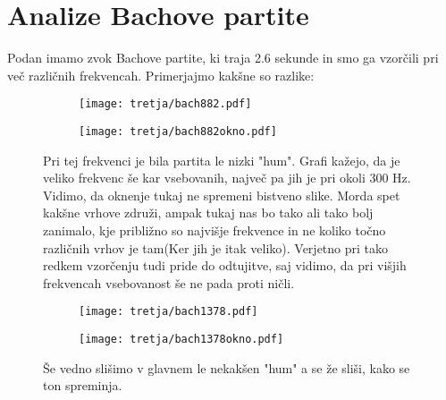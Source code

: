 \documentclass{article}
\begin{document}
\section{Analize Bachove partite}

Podan imamo zvok Bachove partite, ki traja 2.6 sekunde in smo ga vzorčili pri več različnih frekvencah. Primerjajmo kakšne so razlike:

\begin{figure}[H]
\begin{subfigure}{.5\textwidth}
\texttt{[image: tretja/bach882.pdf]}

\end{subfigure}
\begin{subfigure}{.5\textwidth}
\texttt{[image: tretja/bach882okno.pdf]}
\end{subfigure}
\caption*{Pri tej frekvenci je bila partita le nizki "hum". Grafi kažejo, da je veliko frekvenc še kar vsebovanih, največ pa jih je pri okoli 300 Hz. Vidimo, da oknenje tukaj ne spremeni bistveno slike.
Morda spet kakšne vrhove združi, ampak tukaj nas bo tako ali tako bolj zanimalo, kje približno so najvišje frekvence in ne koliko točno različnih vrhov je tam(Ker jih je itak veliko). Verjetno pri tako redkem vzorčenju tudi pride do odtujitve, saj vidimo, da pri višjih frekvencah vsebovanost še ne pada proti ničli.}
\end{figure}

\begin{figure}[H]
\begin{subfigure}{.5\textwidth}
\texttt{[image: tretja/bach1378.pdf]}

\end{subfigure}
\begin{subfigure}{.5\textwidth}
\texttt{[image: tretja/bach1378okno.pdf]}
\end{subfigure}
\caption*{Še vedno slišimo v glavnem le nekakšen "hum" a se že sliši, kako se ton spreminja.}
\end{figure}
\end{document}
